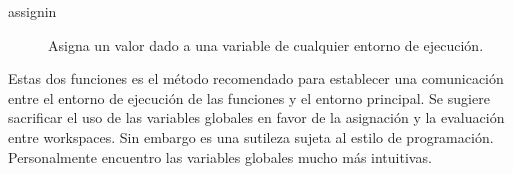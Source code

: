 \begin{description}

\item [assignin]Asigna un valor dado a una variable de
  cualquier entorno de ejecución.
\end{description}

Estas dos funciones es el método recomendado para establecer una
comunicación entre el entorno de ejecución de las funciones y el
entorno principal.  Se sugiere sacrificar el uso de las variables
globales en favor de la asignación y la evaluación entre workspaces.
Sin embargo es una sutileza sujeta al estilo de programación.
Personalmente encuentro las variables globales mucho más intuitivas.






